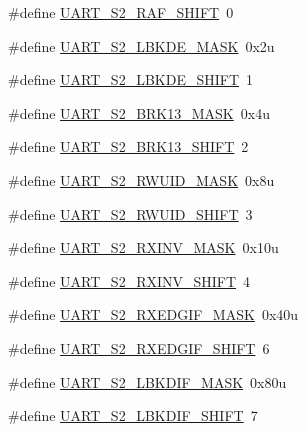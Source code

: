 \begin{DoxyCompactItemize}
\item 
\#define \hyperlink{group___u_a_r_t___register___masks_ga0eb8d9ed83a7cb0ed2edc0d3906ac5f1}{U\+A\+R\+T\+\_\+\+S2\+\_\+\+R\+A\+F\+\_\+\+S\+H\+I\+FT}~0
\item 
\#define \hyperlink{group___u_a_r_t___register___masks_ga537e0b2cc3f4eb0056498ff63641bc3b}{U\+A\+R\+T\+\_\+\+S2\+\_\+\+L\+B\+K\+D\+E\+\_\+\+M\+A\+SK}~0x2u
\item 
\#define \hyperlink{group___u_a_r_t___register___masks_ga192cec151a02a4a29e46b3c061127434}{U\+A\+R\+T\+\_\+\+S2\+\_\+\+L\+B\+K\+D\+E\+\_\+\+S\+H\+I\+FT}~1
\item 
\#define \hyperlink{group___u_a_r_t___register___masks_gab2b333a78ce968eece87bcecd87a8673}{U\+A\+R\+T\+\_\+\+S2\+\_\+\+B\+R\+K13\+\_\+\+M\+A\+SK}~0x4u
\item 
\#define \hyperlink{group___u_a_r_t___register___masks_ga6b19eb1eefbef73859cc6eec77d863e4}{U\+A\+R\+T\+\_\+\+S2\+\_\+\+B\+R\+K13\+\_\+\+S\+H\+I\+FT}~2
\item 
\#define \hyperlink{group___u_a_r_t___register___masks_gac04113c9c307f88a4e51db472d274eee}{U\+A\+R\+T\+\_\+\+S2\+\_\+\+R\+W\+U\+I\+D\+\_\+\+M\+A\+SK}~0x8u
\item 
\#define \hyperlink{group___u_a_r_t___register___masks_ga9a972894e69ee588eab48c8436be9fde}{U\+A\+R\+T\+\_\+\+S2\+\_\+\+R\+W\+U\+I\+D\+\_\+\+S\+H\+I\+FT}~3
\item 
\#define \hyperlink{group___u_a_r_t___register___masks_ga80b6af8d528290157cd93b8e33402e9e}{U\+A\+R\+T\+\_\+\+S2\+\_\+\+R\+X\+I\+N\+V\+\_\+\+M\+A\+SK}~0x10u
\item 
\#define \hyperlink{group___u_a_r_t___register___masks_ga9e9f9f846534bbefdb7c7b88a66d29fc}{U\+A\+R\+T\+\_\+\+S2\+\_\+\+R\+X\+I\+N\+V\+\_\+\+S\+H\+I\+FT}~4
\item 
\#define \hyperlink{group___u_a_r_t___register___masks_ga17b9dd16869c5185f2be9c1394fcede5}{U\+A\+R\+T\+\_\+\+S2\+\_\+\+R\+X\+E\+D\+G\+I\+F\+\_\+\+M\+A\+SK}~0x40u
\item 
\#define \hyperlink{group___u_a_r_t___register___masks_gab5a85582d800238efb298c45e578a83e}{U\+A\+R\+T\+\_\+\+S2\+\_\+\+R\+X\+E\+D\+G\+I\+F\+\_\+\+S\+H\+I\+FT}~6
\item 
\#define \hyperlink{group___u_a_r_t___register___masks_ga874d96e3755d584279e6f058522c2c4a}{U\+A\+R\+T\+\_\+\+S2\+\_\+\+L\+B\+K\+D\+I\+F\+\_\+\+M\+A\+SK}~0x80u
\item 
\#define \hyperlink{group___u_a_r_t___register___masks_ga42b99a34daa824eb7a8c8dd635ee4a4f}{U\+A\+R\+T\+\_\+\+S2\+\_\+\+L\+B\+K\+D\+I\+F\+\_\+\+S\+H\+I\+FT}~7

\end{DoxyCompactItemize}
